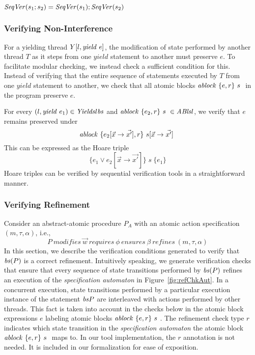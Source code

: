 $ {\mathit{SeqVer}}(s_1; s_2) = {\mathit{SeqVer}}(s_1); {\mathit{SeqVer}}(s_2)$


\subsubsection{Verifying Non-Interference}
For a yielding thread $Y[l, \mathit{yield}\ e]$, the modification of state performed by another thread $T$ as it steps from one $yield$ statement to another must preserve $e$. To facilitate modular checking, we instead check a sufficient condition for this. Instead of verifying that the entire sequence of statements executed by $T$ from one $yield$ statement to another, we check that all atomic blocks $\mathit{ablock}\ {\{e,r\}}\ {s}\ $ in the program preserve $e$.

For every $(l,\mathit{yield}\ e_1) \in \mathit{Yields} l \mathit{bs}$ and $\mathit{ablock}\ {\{e_2,r\}}\ {s}\  \in \mathit{ABls} l$, we verify that $e$ remains preserved under 
$$\mathit{ablock}\ {\{e_2[\vec{x} \rightarrow \vec{x'}],  r\}}\ {s[\vec{x} \rightarrow \vec{x'}]}\ $$
This can be expressed as the Hoare triple 
$$\{ e_1 \vee e_2[\vec{x} \rightarrow \vec{x'}] \} \; s \; \{ e_1 \}$$
Hoare triples can be verified by sequential verification tools in a straightforward manner. 

\subsubsection{Verifying Refinement}
Consider an abstract-atomic procedure $P_{A}$ with an atomic action specification $(m, \tau, \alpha)$, i.e., $$P\ \mathit{modifies}\ \overrightarrow{w}\ \mathit{requires}\ \phi\ \mathit{ensures}\ \beta\ \mathit{refines}\ (m, \tau, \alpha)$$
In this section, we describe the verification conditions generated to verify that $\mathit{bs}(P)$ is a correct refinement. Intuitively speaking, we generate verification checks that ensure that every sequence of state transitions performed by $\mathit{bs}(P)$ refines an execution of the {\em specification automaton} in Figure~\ref{fig:refChkAut}. In a concurrent execution, state transitions performed by a particular execution instance of the statement $\mathit{bs}{P}$ are interleaved with actions performed by other threads. This fact is taken into account in the checks below in the atomic block expressions $e$ labeling atomic blocks $\mathit{ablock}\ {\{e,r\}}\ {s}\ $. The refinement check type $r$ indicates which state transition in the {\em specification automaton} the atomic block $\mathit{ablock}\ {\{e,r\}}\ {s}\ $ maps to. In our tool implementation, the $r$ annotation is not needed. It is included in our formalization for ease of exposition. 

